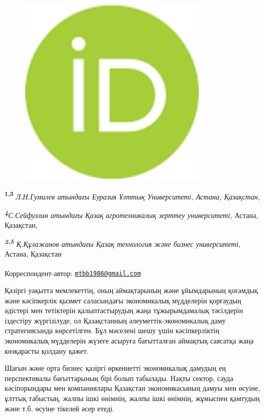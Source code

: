 \begin{figure}[H]
	\centering
	\includegraphics[width=0.8\textwidth]{media/ekon2/image6}
	\caption*{}
\end{figure}


{\bfseries \textsuperscript{1,3}} \emph{Л.Н.Гумилев атындағы Еуразия Ұлттық
Университеті, Астана, Қазақстан,}

\emph{{\bfseries \textsuperscript{4}}С.Сейфуллин атындағы Қазақ
агротехникалық зерттеу университеті,} Астана, Қазақстан,

\emph{{\bfseries \textsuperscript{2,5}} Қ.Құлажанов атындағы Қазақ
технология және бизнес университеті,} Астана, Қазақстан

{\bfseries \textsuperscript{\envelope }}Корреспондент-автор:
\href{mailto:mtbb1986@gmail.com}{\nolinkurl{mtbb1986@gmail.com}}

Қазіргі уақытта мемлекеттің, оның аймақтарының және ұйымдарының қоғамдық
және кәсіпкерлік қызмет саласындағы экономикалық мүдделерін қорғаудың
әдістері мен тетіктерін қалыптастырудың жаңа тұжырымдамалық тәсілдерін
іздестіру жүргізілуде, ол Қазақстанның әлеуметтік-экономикалық даму
стратегиясында көрсетілген. Бұл мәселені шешу үшін кәсіпкерліктің
экономикалық мүдделерін жүзеге асыруға бағытталған аймақтық саясатқа
жаңа көзқарасты қолдану қажет.

Шағын және орта бизнес қазіргі өркениетті экономикалық дамудың ең
перспективалы бағыттарының бірі болып табылады. Нақты сектор, сауда
кәсіпорындары мен компаниялары Қазақстан экономикасының дамуы мен
өсуіне, ұлттық табыстың, жалпы ішкі өнімнің, жалпы ішкі өнімнің,
жұмыспен қамтудың және т.б. өсуіне тікелей әсер етеді.

